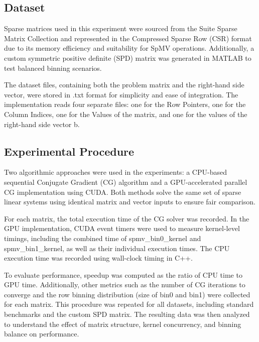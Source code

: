 \documentclass[conference]{IEEEtran}
\begin{document}
\subsection{Dataset}
Sparse matrices used in this experiment were sourced from the Suite Sparse Matrix Collection \cite{b5} and represented in the Compressed Sparse Row (CSR) format due to its memory efficiency and suitability for SpMV operations. Additionally, a custom symmetric positive definite (SPD) matrix was generated in MATLAB to test balanced binning scenarios.

The dataset files, containing both the problem matrix and the right-hand side vector, were stored in .txt format for simplicity and ease of integration. The implementation reads four separate files: one for the Row Pointers, one for the Column Indices, one for the Values of the matrix, and one for the values of the right-hand side vector b.

\subsection{Experimental Procedure}
Two algorithmic approaches were used in the experiments: a CPU-based sequential Conjugate Gradient (CG) algorithm and a GPU-accelerated parallel CG implementation using CUDA. Both methods solve the same set of sparse linear systems using identical matrix and vector inputs to ensure fair comparison.

For each matrix, the total execution time of the CG solver was recorded. In the GPU implementation, CUDA event timers were used to measure kernel-level timings, including the combined time of spmv\_bin0\_kernel and spmv\_bin1\_kernel, as well as their individual execution times. The CPU execution time was recorded using wall-clock timing in C++.

To evaluate performance, speedup was computed as the ratio of CPU time to GPU time. Additionally, other metrics such as the number of CG iterations to converge and the row binning distribution (size of bin0 and bin1) were collected for each matrix. This procedure was repeated for all datasets, including standard benchmarks and the custom SPD matrix. The resulting data was then analyzed to understand the effect of matrix structure, kernel concurrency, and binning balance on performance.
\end{document}
